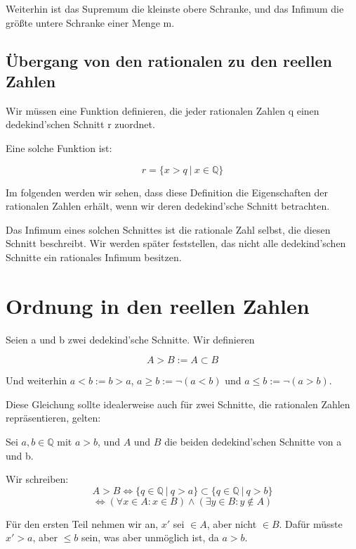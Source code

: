 \documentclass[12pt]{article}
\begin{document}
    Weiterhin ist das Supremum die kleinste obere Schranke, und das Infimum die größte untere Schranke einer Menge m.

    \newpage

    \subsection{Übergang von den rationalen zu den reellen Zahlen}

    Wir müssen eine Funktion definieren, die jeder rationalen Zahlen q einen dedekind'schen Schnitt r zuordnet.

    Eine solche Funktion ist:

    \[r = \{x > q \mspace{4mu} | \mspace{4mu} x \in \mathbb{Q}\}\]

    Im folgenden werden wir sehen, dass diese Definition die Eigenschaften der rationalen Zahlen erhält, wenn
    wir deren dedekind'sche Schnitt betrachten.

    Das Infimum eines solchen Schnittes ist die rationale Zahl selbst, die diesen Schnitt beschreibt.
    Wir werden später feststellen, das nicht alle dedekind'schen Schnitte ein rationales Infimum besitzen.

    \section{Ordnung in den reellen Zahlen}

    Seien a und b zwei dedekind'sche Schnitte. Wir definieren

    \[A > B := A \subset B\]

    Und weiterhin $a < b := b > a$, $a \ge b := \lnot (a < b)$ und $a \le b := \lnot (a > b)$.

    Diese Gleichung sollte idealerweise auch für zwei Schnitte, die rationalen Zahlen repräsentieren, gelten:

    Sei $a, b \in \mathbb{Q}$ mit $a > b$, und $A$ und $B$ die beiden dedekind'schen Schnitte von a und b.

    Wir schreiben:
    \[
        A > B \Leftrightarrow \{q \in \mathbb{Q} \mspace{4mu} | \mspace{4mu} q > a\} \subset
        \{q \in \mathbb{Q} \mspace{4mu} | \mspace{4mu} q > b\}
    \]
    \[
        \Leftrightarrow (\forall x \in A: x \in B) \land (\exists y \in B: y \not \in A)
    \]

    Für den ersten Teil nehmen wir an, $x'$ sei $\in A$, aber nicht $\in B$.
    Dafür müsste $x' > a$, aber $\le b$ sein, was aber unmöglich ist, da $a > b$.
\end{document}
